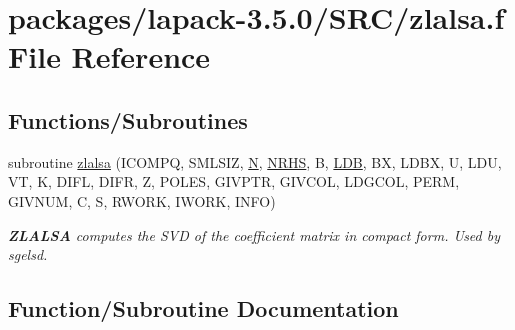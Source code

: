 \hypertarget{zlalsa_8f}{}\section{packages/lapack-\/3.5.0/\+S\+R\+C/zlalsa.f File Reference}
\label{zlalsa_8f}
\subsection*{Functions/\+Subroutines}
\begin{DoxyCompactItemize}
\item 
subroutine \hyperlink{zlalsa_8f_adfb51762868d0b8a6ba8a5ccbd596544}{zlalsa} (I\+C\+O\+M\+P\+Q, S\+M\+L\+S\+I\+Z, \hyperlink{polmisc_8c_a0240ac851181b84ac374872dc5434ee4}{N}, \hyperlink{example__user_8c_aa0138da002ce2a90360df2f521eb3198}{N\+R\+H\+S}, B, \hyperlink{example__user_8c_a50e90a7104df172b5a89a06c47fcca04}{L\+D\+B}, B\+X, L\+D\+B\+X, U, L\+D\+U, V\+T, K, D\+I\+F\+L, D\+I\+F\+R, Z, P\+O\+L\+E\+S, G\+I\+V\+P\+T\+R, G\+I\+V\+C\+O\+L, L\+D\+G\+C\+O\+L, P\+E\+R\+M, G\+I\+V\+N\+U\+M, C, S, R\+W\+O\+R\+K, I\+W\+O\+R\+K, I\+N\+F\+O)
\begin{DoxyCompactList}\small\item\em {\bfseries Z\+L\+A\+L\+S\+A} computes the S\+V\+D of the coefficient matrix in compact form. Used by sgelsd. \end{DoxyCompactList}\end{DoxyCompactItemize}


\subsection{Function/\+Subroutine Documentation}
\hypertarget{zlalsa_8f_adfb51762868d0b8a6ba8a5ccbd596544}{}
